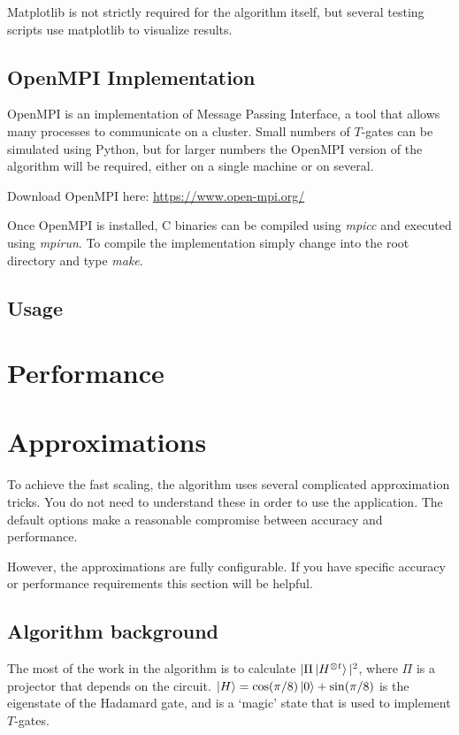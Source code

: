 \documentclass[11pt]{article}
\begin{document}
Matplotlib is not strictly required for the algorithm itself, but several testing scripts use matplotlib to visualize results.

\subsection{OpenMPI Implementation}

OpenMPI is an implementation of Message Passing Interface, a tool that allows many processes to communicate on a cluster. Small numbers of $T$-gates can be simulated using Python, but for larger numbers the OpenMPI version of the algorithm will be required, either on a single machine or on several.

Download OpenMPI here: \url{https://www.open-mpi.org/}

\noindent Once OpenMPI is installed, C binaries can be compiled using \textit{mpicc} and executed using \textit{mpirun}. To compile the implementation simply change into the root directory and type \textit{make}.

\subsection{Usage}




\clearpage
\section{Performance}
\section{Approximations}

To achieve the fast scaling, the algorithm uses several complicated approximation tricks. You do not need to understand these in order to use the application. The default options make a reasonable compromise between accuracy and performance.

However, the approximations are fully configurable. If you have specific accuracy or performance requirements this section will be helpful.

\subsection{Algorithm background}

The most of the work in the algorithm is to calculate $|\Pi\ket{H^{\otimes t}}|^2$, where $\Pi$ is a projector that depends on the circuit. $\ket{H} = \cos(\pi/8)\ket{0} + \sin(\pi/8)$ is the eigenstate of the Hadamard gate, and is a `magic' state that is used to implement $T$-gates. 
\end{document}
